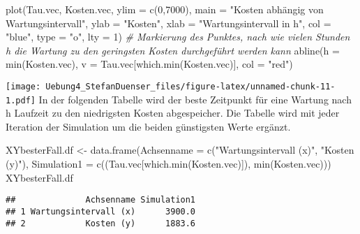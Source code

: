 \documentclass[
]{article}
\newenvironment{Shaded}{\begin{snugshade}}{\end{snugshade}}
\newcommand{\AttributeTok}[1]{\textcolor[rgb]{0.77,0.63,0.00}{#1}}
\newcommand{\CommentTok}[1]{\textcolor[rgb]{0.56,0.35,0.01}{\textit{#1}}}
\newcommand{\DecValTok}[1]{\textcolor[rgb]{0.00,0.00,0.81}{#1}}
\newcommand{\FunctionTok}[1]{\textcolor[rgb]{0.00,0.00,0.00}{#1}}
\newcommand{\NormalTok}[1]{#1}
\newcommand{\OtherTok}[1]{\textcolor[rgb]{0.56,0.35,0.01}{#1}}
\newcommand{\StringTok}[1]{\textcolor[rgb]{0.31,0.60,0.02}{#1}}
\begin{document}
\begin{Shaded}
\begin{Highlighting}[]
\FunctionTok{plot}\NormalTok{(Tau.vec, Kosten.vec, }\AttributeTok{ylim =} \FunctionTok{c}\NormalTok{(}\DecValTok{0}\NormalTok{,}\DecValTok{7000}\NormalTok{), }\AttributeTok{main =} \StringTok{"Kosten abhängig von Wartungsintervall"}\NormalTok{, }\AttributeTok{ylab =} \StringTok{"Kosten"}\NormalTok{, }\AttributeTok{xlab =} \StringTok{"Wartungsintervall in h"}\NormalTok{, }\AttributeTok{col =} \StringTok{"blue"}\NormalTok{, }\AttributeTok{type =} \StringTok{"o"}\NormalTok{, }\AttributeTok{lty =} \DecValTok{1}\NormalTok{)}
\CommentTok{\# Markierung des Punktes, nach wie vielen Stunden h die Wartung zu den geringsten Kosten durchgeführt werden kann}
\FunctionTok{abline}\NormalTok{(}\AttributeTok{h =} \FunctionTok{min}\NormalTok{(Kosten.vec), }\AttributeTok{v =}\NormalTok{ Tau.vec[}\FunctionTok{which.min}\NormalTok{(Kosten.vec)], }\AttributeTok{col =} \StringTok{"red"}\NormalTok{)}
\end{Highlighting}
\end{Shaded}

\texttt{[image: Uebung4\_StefanDuenser\_files/figure-latex/unnamed-chunk-11-1.pdf]}
In der folgenden Tabelle wird der beste Zeitpunkt für eine Wartung nach
h Laufzeit zu den niedrigsten Kosten abgespeicher. Die Tabelle wird mit
jeder Iteration der Simulation um die beiden günstigsten Werte ergänzt.

\begin{Shaded}
\begin{Highlighting}[]
\NormalTok{XYbesterFall.df }\OtherTok{\textless{}{-}} \FunctionTok{data.frame}\NormalTok{(}\AttributeTok{Achsenname =} \FunctionTok{c}\NormalTok{(}\StringTok{"Wartungsintervall (x)"}\NormalTok{, }\StringTok{"Kosten (y)"}\NormalTok{), }\AttributeTok{Simulation1 =} \FunctionTok{c}\NormalTok{((Tau.vec[}\FunctionTok{which.min}\NormalTok{(Kosten.vec)]), }\FunctionTok{min}\NormalTok{(Kosten.vec)))}
\NormalTok{XYbesterFall.df}
\end{Highlighting}
\end{Shaded}

\begin{verbatim}
##              Achsenname Simulation1
## 1 Wartungsintervall (x)      3900.0
## 2            Kosten (y)      1883.6
\end{verbatim}
\end{document}

